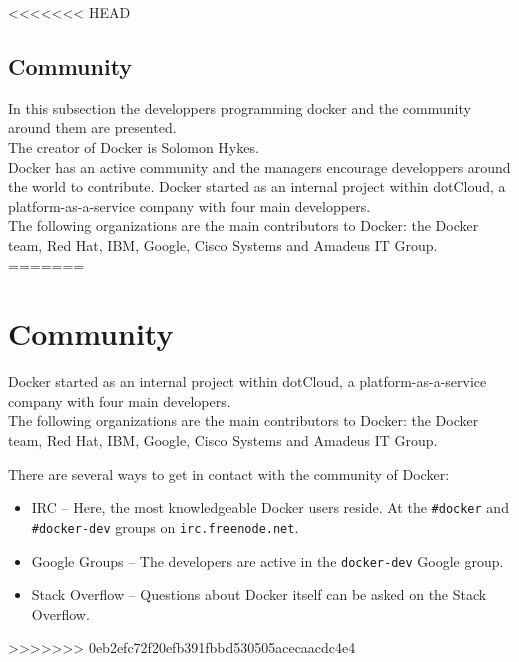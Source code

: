 <<<<<<< HEAD
\subsection{Community}
In this subsection the developpers programming docker and the community around them are presented. \\
The creator of Docker is Solomon Hykes. \\
Docker has an active community and the managers encourage developpers around the world to contribute. 
Docker started as an internal project within dotCloud, a platform-as-a-service company with four main developpers. \\
The following organizations are the main contributors to Docker: the Docker team, Red Hat, IBM, Google, Cisco Systems and Amadeus IT Group. \\

=======
\section{Community}
Docker started as an internal project within dotCloud, a platform-as-a-service company with four main developers. \\
The following organizations are the main contributors to Docker: the Docker team, Red Hat, IBM, Google, Cisco Systems and Amadeus IT Group. 

There are several ways to get in contact with the community of Docker:
\begin{itemize}
\item IRC -- Here, the most knowledgeable Docker users reside. At the \verb|#docker| and \verb|#docker-dev| groups on \verb|irc.freenode.net|.

\item Google Groups -- The developers are active in the \verb|docker-dev| Google group.

\item Stack Overflow -- Questions about Docker itself can be asked on the Stack Overflow. 
\end{itemize}
>>>>>>> 0eb2efc72f20efb391fbbd530505acecaacdc4e4

